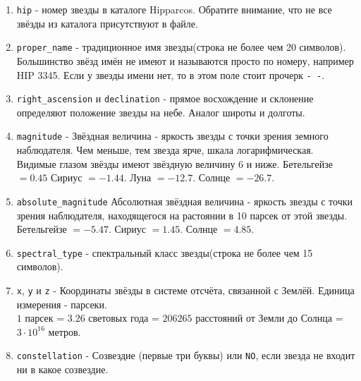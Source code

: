 \documentclass{article}
\begin{document}
\begin{enumerate}
\item \texttt{hip} - номер звезды в каталоге Hipparcos. Обратите внимание, что не все звёзды из каталога присутствуют в файле.
\item \texttt{proper\_name} - традиционное имя звезды(строка не более чем 20 символов). Большинство звёзд имён не имеют и называются просто по номеру, например HIP 3345. Если у звезды имени нет, то в этом поле стоит прочерк \texttt{-\,-}.
\item \texttt{right\_ascension} и \texttt{declination} - прямое восхождение и склонение определяют положение звезды на небе. Аналог широты и долготы.
\item \texttt{magnitude} - Звёздная величина - яркость звезды с точки зрения земного наблюдателя. Чем меньше, тем звезда ярче, шкала логарифмическая. Видимые глазом звёзды имеют звёздную величину 6 и ниже. Бетельгейзе $= 0.45$ Сириус $= -1.44$. Луна $= -12.7$. Солнце $= -26.7$. 
\item \texttt{absolute\_magnitude} Абсолютная звёздная величина - яркость звезды с точки зрения наблюдателя, находящегося на растоянии в 10 парсек от этой звезды. Бетельгейзе $= -5.47$. Сириус $= 1.45$. Солнце $= 4.85$. 
\item \texttt{spectral\_type} - спектральный класс звезды(строка не более чем 15 символов). 
\item \texttt{x}, \texttt{y} и \texttt{z} - Координаты звёзды в системе отсчёта, связанной с Землёй. Единица измерения - парсеки. \\
$1$ парсек = $3.26$ световых года = $206265$ расстояний от Земли до Солнца = $3 \cdot 10^{16}$ метров.
\item \texttt{constellation} - Созвездие (первые три буквы) или \texttt{NO}, если звезда не входит ни в какое созвездие.
\end{enumerate}
\end{document}
